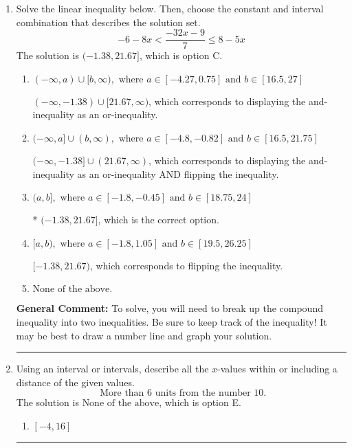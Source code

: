 \documentclass{extbook}[14pt]
\newcommand{\litem}[1]{\item #1

\rule{\textwidth}{0.4pt}}
\begin{document}
\begin{enumerate}
{\begin{enumerate}[label=\Alph*.]
 $(-\infty, -1.391)$, which corresponds to negating the endpoint of the solution.
\item \( \text{None of the above}. \)

You may have chosen this if you thought the inequality did not match the ends of the intervals.
\end{enumerate}

\textbf{General Comment:} Remember that less/greater than or equal to includes the endpoint, while less/greater do not. Also, remember that you need to flip the inequality when you multiply or divide by a negative.
}
\litem{
Solve the linear inequality below. Then, choose the constant and interval combination that describes the solution set.
\[ -6 - 8 x < \frac{-32 x - 9}{7} \leq 8 - 5 x \]The solution is \( (-1.38, 21.67] \), which is option C.\begin{enumerate}[label=\Alph*.]
\item \( (-\infty, a) \cup [b, \infty), \text{ where } a \in [-4.27, 0.75] \text{ and } b \in [16.5, 27] \)

$(-\infty, -1.38) \cup [21.67, \infty)$, which corresponds to displaying the and-inequality as an or-inequality.
\item \( (-\infty, a] \cup (b, \infty), \text{ where } a \in [-4.8, -0.82] \text{ and } b \in [16.5, 21.75] \)

$(-\infty, -1.38] \cup (21.67, \infty)$, which corresponds to displaying the and-inequality as an or-inequality AND flipping the inequality.
\item \( (a, b], \text{ where } a \in [-1.8, -0.45] \text{ and } b \in [18.75, 24] \)

* $(-1.38, 21.67]$, which is the correct option.
\item \( [a, b), \text{ where } a \in [-1.8, 1.05] \text{ and } b \in [19.5, 26.25] \)

$[-1.38, 21.67)$, which corresponds to flipping the inequality.
\item \( \text{None of the above.} \)


\end{enumerate}

\textbf{General Comment:} To solve, you will need to break up the compound inequality into two inequalities. Be sure to keep track of the inequality! It may be best to draw a number line and graph your solution.
}
\litem{
Using an interval or intervals, describe all the $x$-values within or including a distance of the given values.
\[ \text{ More than } 6 \text{ units from the number } 10. \]The solution is \( \text{None of the above} \), which is option E.\begin{enumerate}[label=\Alph*.]
\item \( [-4, 16] \)


\end{enumerate}}
\end{enumerate}
\end{document}
